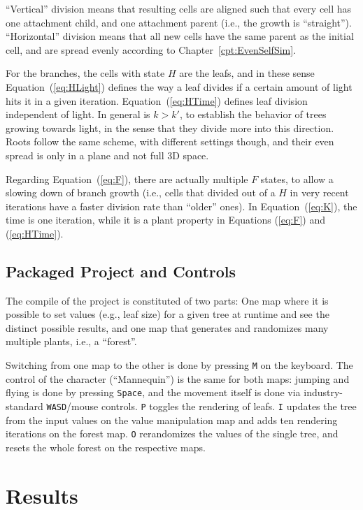\documentclass[11pt, abstract=on]{scrartcl}
\begin{document}
``Vertical'' division means that resulting cells are aligned such that every cell has one attachment child, and one attachment parent (i.e., the growth is ``straight''). ``Horizontal'' division means that all new cells have the same parent as the initial cell, and are spread evenly according to Chapter~\ref{cpt:EvenSelfSim}.

For the branches, the cells with state $H$ are the leafs, and in these sense Equation~(\ref{eq:HLight}) defines the way a leaf divides if a certain amount of light hits it in a given iteration. Equation~(\ref{eq:HTime}) defines leaf division independent of light. In general is $k > k'$, to establish the behavior of trees growing towards light, in the sense that they divide more into this direction. Roots follow the same scheme, with different settings though, and their even spread is only in a plane and not full 3D space.

Regarding Equation~(\ref{eq:F}), there are actually multiple $F$ states, to allow a slowing down of branch growth (i.e., cells that divided out of a $H$ in very recent iterations have a faster division rate than ``older'' ones). In Equation~(\ref{eq:K}), the time is one iteration, while it is a plant property in Equations (\ref{eq:F}) and (\ref{eq:HTime}).

\subsection{Packaged Project and Controls}
The compile of the project is constituted of two parts: One map where it is possible to set values (e.g., leaf size) for a given tree at runtime and see the distinct possible results, and one map that generates and randomizes many multiple plants, i.e., a ``forest''.

Switching from one map to the other is done by pressing \texttt{M} on the keyboard. The control of the character (``Mannequin'') is the same for both maps: jumping and flying is done by pressing \texttt{Space}, and the movement itself is done via industry-standard \texttt{WASD}/mouse controls. \texttt{P} toggles the rendering of leafs. \texttt{I} updates the tree from the input values on the value manipulation map and adds ten rendering iterations on the forest map. \texttt{O} rerandomizes the values of the single tree, and resets the whole forest on the respective maps.


\section{Results}
\end{document}
